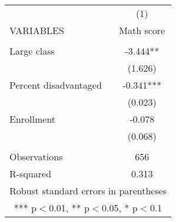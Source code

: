 \documentclass[]{article}
\begin{document}
\begin{tabular}{lc} \hline
 & (1) \\
VARIABLES & Math score \\ \hline
 &  \\
Large class & -3.444** \\
 & (1.626) \\
Percent disadvantaged & -0.341*** \\
 & (0.023) \\
Enrollment & -0.078 \\
 & (0.068) \\
 &  \\
Observations & 656 \\
 R-squared & 0.313 \\ \hline
\multicolumn{2}{c}{ Robust standard errors in parentheses} \\
\multicolumn{2}{c}{ *** p$<$0.01, ** p$<$0.05, * p$<$0.1} \\
\end{tabular}
\end{document}
